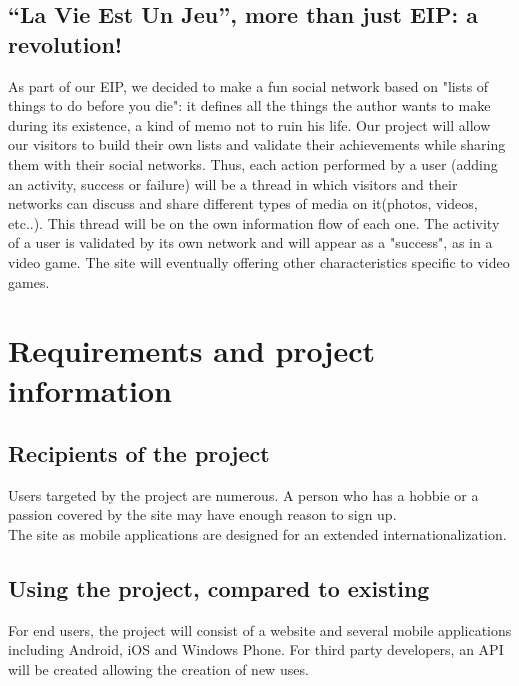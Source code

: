 \documentclass {life-en}
\begin{document}
\section{``La Vie Est Un Jeu'', more than just EIP: a revolution!}

As part of our EIP, we decided to make a fun social network based on "lists of things to do before you die": it defines all the things the author wants to make during its existence, a kind of memo not to ruin his life. Our project will allow our visitors to build their own lists and validate their achievements while sharing them with their social networks. Thus, each action performed by a user (adding an activity, success or failure) will be a thread in which visitors and their networks can discuss and share different types of media on it(photos, videos, etc..). This thread will be on the own information flow of each one. The activity of a user is validated by its own network and will appear as a "success", as in a video game. The site will eventually offering other characteristics specific to video games.


\chapter{Requirements and project information}

\section{Recipients of the project}

Users targeted by the project are numerous. A person who has a hobbie or a passion covered by the site may have enough reason to sign up.\\

The site as mobile applications are designed for an extended internationalization.

\section{Using the project, compared to existing}

For end users, the project will consist of a website and several mobile applications including Android, iOS and Windows Phone. For third party developers, an API will be created allowing the creation of new uses.\\
\end{document}
